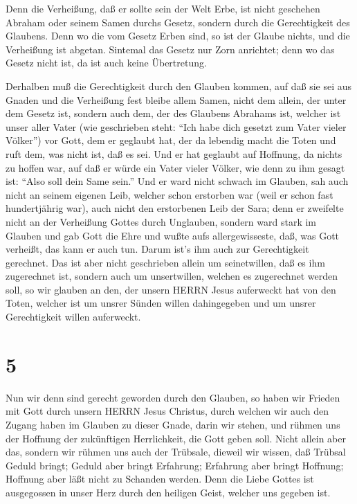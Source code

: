  Denn die Verheißung, daß er sollte sein der Welt Erbe, ist
nicht geschehen Abraham oder seinem Samen durchs Gesetz, sondern durch
die Gerechtigkeit des Glaubens.  Denn wo die vom Gesetz
Erben sind, so ist der Glaube nichts, und die Verheißung ist abgetan.
 Sintemal das Gesetz nur Zorn anrichtet; denn wo das Gesetz
nicht ist, da ist auch keine Übertretung.

 Derhalben muß die Gerechtigkeit durch den Glauben kommen,
auf daß sie sei aus Gnaden und die Verheißung fest bleibe allem Samen,
nicht dem allein, der unter dem Gesetz ist, sondern auch dem, der des
Glaubens Abrahams ist, welcher ist unser aller Vater  (wie
geschrieben steht: ``Ich habe dich gesetzt zum Vater vieler Völker'')
vor Gott, dem er geglaubt hat, der da lebendig macht die Toten und ruft
dem, was nicht ist, daß es sei.  Und er hat geglaubt auf
Hoffnung, da nichts zu hoffen war, auf daß er würde ein Vater vieler
Völker, wie denn zu ihm gesagt ist: ``Also soll dein Same sein.''
 Und er ward nicht schwach im Glauben, sah auch nicht an
seinem eigenen Leib, welcher schon erstorben war (weil er schon fast
hundertjährig war), auch nicht den erstorbenen Leib der Sara;
 denn er zweifelte nicht an der Verheißung Gottes durch
Unglauben, sondern ward stark im Glauben und gab Gott die Ehre
 und wußte aufs allergewisseste, daß, was Gott verheißt,
das kann er auch tun.  Darum ist's ihm auch zur
Gerechtigkeit gerechnet.  Das ist aber nicht geschrieben
allein um seinetwillen, daß es ihm zugerechnet ist, 
sondern auch um unsertwillen, welchen es zugerechnet werden soll, so wir
glauben an den, der unsern HERRN Jesus auferweckt hat von den Toten,
 welcher ist um unsrer Sünden willen dahingegeben und um
unsrer Gerechtigkeit willen auferweckt.

\hypertarget{section-4}{%
\section{5}\label{section-4}}

 Nun wir denn sind gerecht geworden durch den Glauben, so
haben wir Frieden mit Gott durch unsern HERRN Jesus Christus,
 durch welchen wir auch den Zugang haben im Glauben zu
dieser Gnade, darin wir stehen, und rühmen uns der Hoffnung der
zukünftigen Herrlichkeit, die Gott geben soll.  Nicht allein
aber das, sondern wir rühmen uns auch der Trübsale, dieweil wir wissen,
daß Trübsal Geduld bringt;  Geduld aber bringt Erfahrung;
Erfahrung aber bringt Hoffnung;  Hoffnung aber läßt nicht zu
Schanden werden. Denn die Liebe Gottes ist ausgegossen in unser Herz
durch den heiligen Geist, welcher uns gegeben ist.

